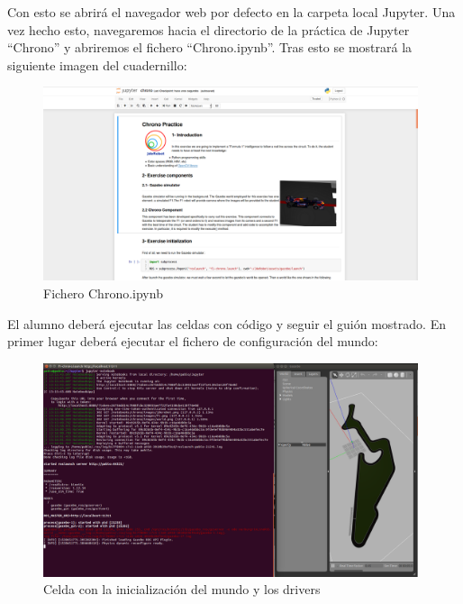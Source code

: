 Con esto se abrirá el navegador web por defecto en la carpeta local Jupyter. Una vez hecho esto, navegaremos hacia el directorio de la práctica de Jupyter ``Chrono'' y abriremos el fichero ``Chrono.ipynb''. Tras esto se mostrará la siguiente imagen del cuadernillo:

\begin{figure}[H]
  \begin{center}
    \includegraphics[width=0.98\textwidth]{figures/ipynb_chrono.png}
		\caption{Fichero Chrono.ipynb}
		\label{fig.fcipynb}
		\end{center}
\end{figure}

El alumno deberá ejecutar las celdas con código y seguir el guión mostrado. En primer lugar deberá ejecutar el fichero de configuración del mundo:

\begin{figure}[H]
  \begin{center}
    \includegraphics[width=0.98\textwidth]{figures/celda_mundo_chrono.png}
		\caption{Celda con la inicialización del mundo y los drivers}
		\label{fig.cmdc}
		\end{center}
\end{figure}

